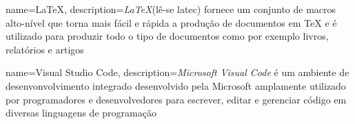 {
  name={\LaTeX},
  description={\textit{\LaTeX}(lê-se latec) fornece um conjunto de macros alto-nível que torna mais fácil e rápida a produção de documentos em TeX e é utilizado para produzir todo o tipo de documentos como por exemplo livros, relatórios e artigos}
}

{
  name={Visual Studio Code},
  description={\textit{Microsoft Visual Code} é um ambiente de desenvonvolvimento integrado desenvolvido pela Microsoft amplamente utilizado por programadores e desenvolvedores para escrever, editar e gerenciar código em diversas linguagens de programação}
}

\printglossary